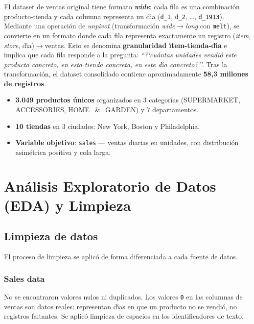 \documentclass[12pt, a4paper, oneside]{report}
\newcommand{\code}[1]{\texttt{\small\color{codeblue}#1}}
\begin{document}
El dataset de ventas original tiene formato \textbf{\textit{wide}}: cada fila es una combinaci\'on producto-tienda y cada columna representa un d\'{\i}a (\code{d\_1}, \code{d\_2}, \ldots, \code{d\_1913}). Mediante una operaci\'on de \textit{unpivot} (transformaci\'on \textit{wide}$\rightarrow$\textit{long} con \code{melt}), se convierte en un formato donde cada fila representa exactamente un registro (\textit{item}, \textit{store}, d\'{\i}a)$\rightarrow$ventas. Esto se denomina \textbf{granularidad \'{\i}tem-tienda-d\'{\i}a} e implica que cada fila responde a la pregunta: \textit{``?`cu\'antas unidades vendi\'o este producto concreto, en esta tienda concreta, en este d\'{\i}a concreto?''}. Tras la transformaci\'on, el dataset consolidado contiene aproximadamente \textbf{58,3 millones de registros}.

\begin{tcolorbox}[insightbox, title={Caracter\'{\i}sticas del \'ambito de an\'alisis}]
\begin{itemize}[noitemsep, leftmargin=*]
  \item \textbf{3.049 productos \'unicos} organizados en 3 categor\'{\i}as (SUPERMARKET, ACCESSORIES, HOME\_\&\_GARDEN) y 7 departamentos.
  \item \textbf{10 tiendas} en 3 ciudades: New York, Boston y Philadelphia.
  \item \textbf{Variable objetivo}: \code{sales} --- ventas diarias en unidades, con distribuci\'on asim\'etrica positiva y cola larga.
\end{itemize}
\end{tcolorbox}

\section{An\'alisis Exploratorio de Datos (EDA) y Limpieza}

\subsection{Limpieza de datos}

El proceso de limpieza se aplic\'o de forma diferenciada a cada fuente de datos.

\subsubsection{Sales data}
No se encontraron valores nulos ni duplicados. Los valores \code{0} en las columnas de ventas son datos reales: representan d\'{\i}as en que un producto no se vendi\'o, no registros faltantes. Se aplic\'o limpieza de espacios en los identificadores de texto.
\end{document}
